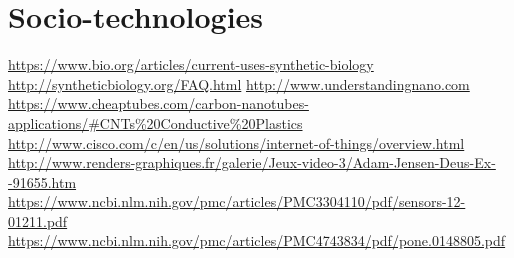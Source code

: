 \documentclass{beamer}
\begin{document}
\section{Socio-technologies}

\begin{thebibliography}{0}
	\url{https://www.bio.org/articles/current-uses-synthetic-biology}
	\url{http://syntheticbiology.org/FAQ.html}
	\url{http://www.understandingnano.com}
	\url{https://www.cheaptubes.com/carbon-nanotubes-applications/#CNTs%20Conductive%20Plastics}
	\url{http://www.cisco.com/c/en/us/solutions/internet-of-things/overview.html}
	\url{http://www.renders-graphiques.fr/galerie/Jeux-video-3/Adam-Jensen-Deus-Ex--91655.htm}
	\url{https://www.ncbi.nlm.nih.gov/pmc/articles/PMC3304110/pdf/sensors-12-01211.pdf}
	\url{https://www.ncbi.nlm.nih.gov/pmc/articles/PMC4743834/pdf/pone.0148805.pdf}
\end{thebibliography}
\end{document}
